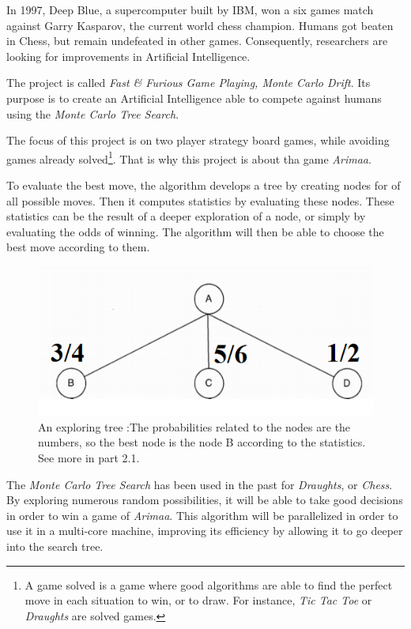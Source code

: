 
In 1997, Deep Blue, a supercomputer built by IBM, won a six games match against Garry Kasparov, the current world chess champion. Humans got beaten in Chess, but remain undefeated in other games. Consequently, researchers are looking for improvements in Artificial Intelligence.
\newline

The project is called \emph{Fast \& Furious Game Playing, Monte Carlo Drift}. Its purpose is to create an Artificial Intelligence able to compete against humans using the \emph{Monte Carlo Tree Search}.
\newline

The focus of this project is on two player strategy board games, while avoiding games already solved\footnote{A game solved is a game where good algorithms are able to find the perfect move in each situation to win, or to draw. For instance, \textit{Tic Tac Toe} or \textit{Draughts} are solved games.}. That is why this project is about tha game \emph{Arimaa}.
\newline

To evaluate the best move, the algorithm develops a tree by creating nodes for of all possible moves. Then it computes statistics by evaluating these nodes. These statistics can be the result of a deeper exploration of a node, or simply by evaluating the odds of winning. The algorithm will then be able to choose the best move according to them.
\smallbreak
\begin{figure}[!h] 
\centerline{\includegraphics[scale=0.50]{1_Presentation/1.1_Our_project_Dan/tree}}
  \caption{An exploring tree :\newline The probabilities related to the nodes are the numbers, so the best node is the node B according to the statistics. See more in part 2.1.} %
  \centering
\end{figure}
The \emph{Monte Carlo Tree Search} has been used in the past for \textit{Draughts}, or \textit{Chess}. By exploring numerous random possibilities, it will be able to take good decisions in order to win a game of \emph{Arimaa}.
This algorithm will be parallelized in order to use it in a multi-core machine, improving its efficiency by allowing it to go deeper into the search tree.
\newline

